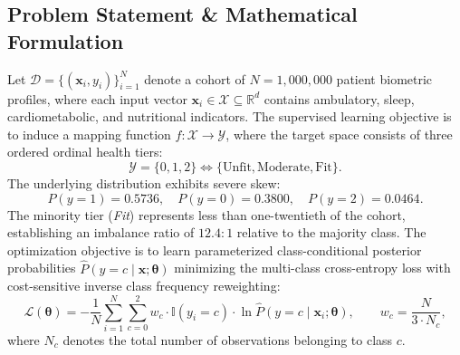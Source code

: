 \documentclass[11pt,a4paper]{article}
\begin{document}
\subsection{Problem Statement \& Mathematical Formulation}
Let $\mathcal{D} = \{(\mathbf{x}_i, y_i)\}_{i=1}^N$ denote a cohort of $N = 1{,}000{,}000$ patient biometric profiles, where each input vector $\mathbf{x}_i \in \mathcal{X} \subseteq \mathbb{R}^d$ contains ambulatory, sleep, cardiometabolic, and nutritional indicators. The supervised learning objective is to induce a mapping function $f: \mathcal{X} \to \mathcal{Y}$, where the target space consists of three ordered ordinal health tiers:
\begin{equation}
\mathcal{Y} = \{0, 1, 2\} \iff \{\text{Unfit}, \text{Moderate}, \text{Fit}\}.
\end{equation}
The underlying distribution exhibits severe skew:
\begin{equation}
P(y = 1) = 0.5736, \quad P(y = 0) = 0.3800, \quad P(y = 2) = 0.0464.
\end{equation}
The minority tier (\emph{Fit}) represents less than one-twentieth of the cohort, establishing an imbalance ratio of $12.4 : 1$ relative to the majority class. The optimization objective is to learn parameterized class-conditional posterior probabilities $\hat{P}(y = c \mid \mathbf{x}; \boldsymbol{\theta})$ minimizing the multi-class cross-entropy loss with cost-sensitive inverse class frequency reweighting:
\begin{equation}
\mathcal{L}(\boldsymbol{\theta}) = -\frac{1}{N} \sum_{i=1}^N \sum_{c=0}^2 w_c \cdot \mathbb{I}(y_i = c) \cdot \ln \hat{P}(y = c \mid \mathbf{x}_i; \boldsymbol{\theta}), \qquad w_c = \frac{N}{3 \cdot N_c},
\end{equation}
where $N_c$ denotes the total number of observations belonging to class $c$.
\end{document}
